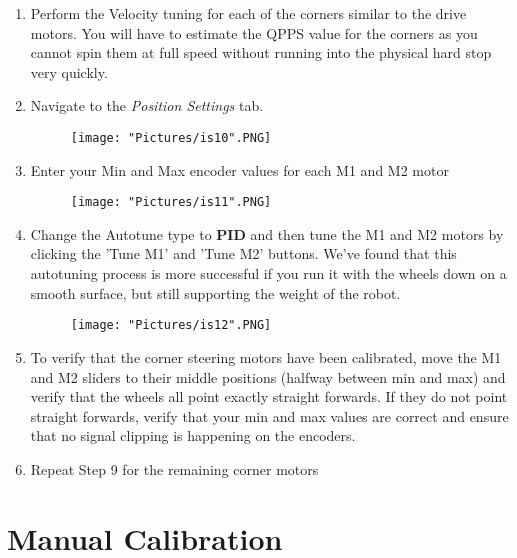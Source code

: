\documentclass[12pt]{article}
\begin{document}
\begin{enumerate}
\begin{enumerate}
		\item Perform the Velocity tuning for each of the corners similar to the drive motors. You will have to estimate the QPPS value for the corners as you cannot spin them at full speed without running into the physical hard stop very quickly. 

		\item Navigate to the \textit{Position Settings} tab. 

		\begin{figure}[H]
	 		\centering
			\texttt{[image: "Pictures/is10".PNG]}
	 		\caption{}
		\end{figure}
		
		\item Enter your Min and Max encoder values for each M1 and M2 motor

		\begin{figure}[H]
	 		\centering
			\texttt{[image: "Pictures/is11".PNG]}
	 		\caption{}
		\end{figure}	

		\item Change the Autotune type to \textbf{PID} and then tune the M1 and M2 motors by clicking the 'Tune M1' and 'Tune M2' buttons. We've found that this autotuning process is more successful if you run it with the wheels down on a smooth surface, but still supporting the weight of the robot. 

		\begin{figure}[H]
	 		\centering
			\texttt{[image: "Pictures/is12".PNG]}
	 		\caption{}
		\end{figure}	

		\item To verify that the corner steering motors have been calibrated, move the M1 and M2 sliders to their middle positions (halfway between min and max) and verify that the wheels all point exactly straight forwards. If they do not point straight forwards, verify that your min and max values are correct and ensure that no signal clipping is happening on the encoders.

		\item Repeat Step 9 for the remaining corner motors
	\end{enumerate}

\end{enumerate} 

\section{Manual Calibration}
\label{manual_calibration}
\end{document}
